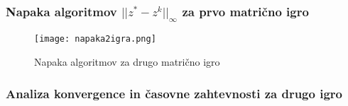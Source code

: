 \documentclass{beamer}
\theoremstyle{definition}
\theoremstyle{plain}
\begin{document}
\begin{frame}
    \frametitle{Napaka algoritmov $||z^* - z^{k}||_{\infty}$ za prvo matrično igro}
    \begin{figure}
        \centering
        \texttt{[image: napaka2igra.png]}
        \caption{Napaka algoritmov za drugo matrično igro}
        \label{fig:napaka2}
      \end{figure}
\end{frame}
\begin{frame}
    \frametitle{Analiza konvergence in časovne zahtevnosti za drugo igro}
    \begin{table}[]
\end{table}
\end{frame}
\end{document}
